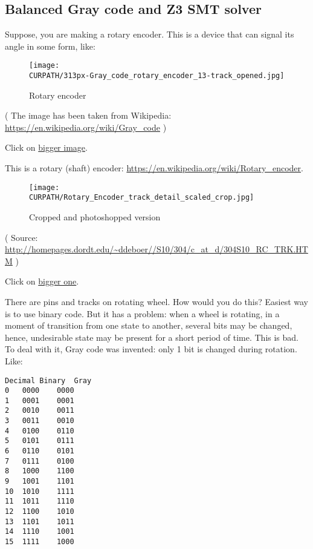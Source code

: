 \subsection{Balanced Gray code and Z3 SMT solver}
\label{Gray_Z3}

\renewcommand{\CURPATH}{gray_code/SMT}

Suppose, you are making a rotary encoder.
This is a device that can signal its angle in some form, like:

\begin{figure}[H]
\centering
\texttt{[image: \\CURPATH/313px-Gray\_code\_rotary\_encoder\_13-track\_opened.jpg]}
\caption{Rotary encoder}
\end{figure}

( The image has been taken from Wikipedia: \url{https://en.wikipedia.org/wiki/Gray_code} )

Click on \href{https://github.com/DennisYurichev/SAT_SMT_by_example/blob/master/gray_code/SMT/Gray_code_rotary_encoder_13-track_opened.jpg}{bigger image}.

This is a rotary (shaft) encoder: \url{https://en.wikipedia.org/wiki/Rotary_encoder}.

\begin{figure}[H]
\centering
\texttt{[image: \\CURPATH/Rotary\_Encoder\_track\_detail\_scaled\_crop.jpg]}
\caption{Cropped and photoshopped version}
\end{figure}

( Source: \url{http://homepages.dordt.edu/~ddeboer//S10/304/c_at_d/304S10_RC_TRK.HTM} )

Click on
\href{https://github.com/DennisYurichev/SAT_SMT_by_example/blob/master/gray_code/SMT/Rotary_Encoder_track_detail.jpg}{bigger one}.

There are pins and tracks on rotating wheel.
How would you do this?
Easiest way is to use binary code.
But it has a problem: when a wheel is rotating, in a moment of transition from one state to another, several bits may be changed, hence, undesirable state may be present for a short period of time.
This is bad.
To deal with it, Gray code was invented: only 1 bit is changed during rotation.
Like:

\begin{lstlisting}
Decimal Binary  Gray
0 	0000 	0000
1 	0001 	0001
2 	0010 	0011
3 	0011 	0010
4 	0100 	0110
5 	0101 	0111
6 	0110 	0101
7 	0111 	0100
8 	1000 	1100
9 	1001 	1101
10 	1010 	1111
11 	1011 	1110
12 	1100 	1010
13 	1101 	1011
14 	1110 	1001
15 	1111 	1000
\end{lstlisting}

